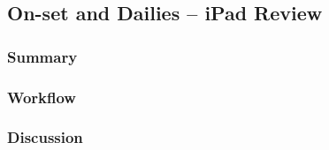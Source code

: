 \subsection{On-set and Dailies -- iPad Review} \label{subsec:tv-onset-dailies-ipad}

	\subsubsection{Summary}
	
	\lipsum[1] %
	
	\subsubsection{Workflow}
	
	\lipsum[1] %
	
	\subsubsection{Discussion}
	
	\lipsum[1] %
	